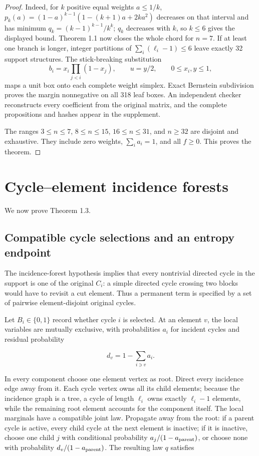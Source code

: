 \documentclass[11pt]{article}
\begin{document}
\begin{proof}
Indeed, for $k$ positive equal weights $a\le1/k$,
$p_k(a)=(1-a)^{k-1}(1-(k+1)a+2ka^2)$ decreases on that interval and
has minimum $q_k=(k-1)^{k-1}/k^k$; $q_k$ decreases with $k$, so
$k\le6$ gives the displayed bound.  Theorem 1.1 now closes the whole chord
for $n=7$.  If at least one branch is
longer, integer partitions of $\sum_i(\ell_i-1)\le6$ leave exactly 32
support structures.  The stick-breaking substitution
\[
b_i=x_i\prod_{j<i}(1-x_j),\qquad u=y/2,
\qquad 0\le x_i,y\le1,
\]
maps a unit box onto each complete weight simplex.  Exact Bernstein
subdivision proves the margin nonnegative on all 318 leaf boxes.  An
independent checker reconstructs every coefficient from the original matrix,
and the complete propositions and hashes appear in the supplement.

The ranges $3\le n\le7$, $8\le n\le15$,
$16\le n\le31$, and $n\ge32$ are disjoint and exhaustive.
They include zero weights, $\sum_i a_i=1$, and all $f\ge0$.
This proves the theorem.
\end{proof}


\section{Cycle--element incidence forests}


We now prove Theorem 1.3.

\subsection{Compatible cycle selections and an entropy endpoint}


The incidence-forest hypothesis implies that every nontrivial directed cycle in the
support is one of the original $C_i$: a simple directed cycle crossing two blocks
would have to revisit a cut element.  Thus a permanent term is specified by a set of
pairwise element-disjoint original cycles.

Let $B_i\in\{0,1\}$ record whether cycle $i$ is selected.  At an element $v$,
the local variables are mutually exclusive, with probabilities $a_i$ for incident
cycles and residual probability

\[
d_v=1-\sum_{i\ni v}a_i.
\]

In every component choose one element vertex as root.  Direct every incidence
edge away from it.  Each cycle vertex owns all its child elements; because the
incidence graph is a tree, a cycle of length $\ell_i$ owns exactly
$\ell_i-1$ elements, while the remaining root element accounts for the
component itself.  The local marginals have a compatible joint law.  Propagate
away from the root: if a parent cycle is active, every child cycle at the next
element is inactive; if it is inactive, choose one child $j$ with conditional
probability $a_j/(1-a_{\rm parent})$, or choose none with probability
$d_v/(1-a_{\rm parent})$.  The resulting law $q$ satisfies
\end{document}
